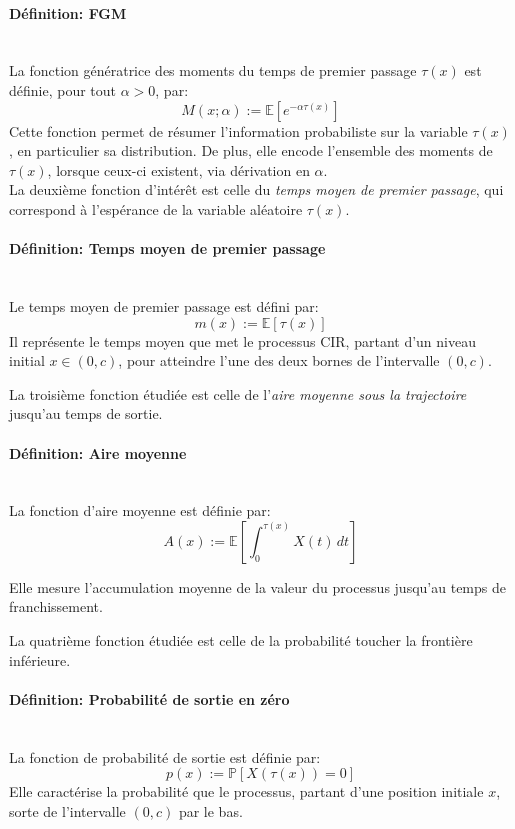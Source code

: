 \paragraph{Définition: \ac{FGM}}\mbox{}\\
La fonction génératrice des moments du temps de premier passage $\tau(x)$ est définie, pour tout $\alpha > 0$, par:
\begin{equation}\label{fgm}
    M(x;\alpha):= \mathds{E} \left[ e^{-\alpha \tau(x)} \right]
\end{equation}
Cette fonction permet de résumer l'information probabiliste sur la variable $\tau(x)$, en particulier sa distribution. De plus, elle encode l'ensemble des moments de $\tau(x)$, lorsque ceux-ci existent, via dérivation en $\alpha$. \\

La deuxième fonction d'intérêt est celle du \textit{temps moyen de premier passage}, qui correspond à l'espérance de la variable aléatoire $\tau(x)$.
\paragraph{Définition: Temps moyen de premier passage}\mbox{}\\
Le temps moyen de premier passage est défini par:
\begin{equation}\label{mean}
    m(x):= \mathds{E}[\tau(x)]
\end{equation}
Il représente le temps moyen que met le processus \acs{CIR}, partant d'un niveau initial $x \in (0,c)$, pour atteindre l'une des deux bornes de l'intervalle $(0,c)$.

La troisième fonction étudiée est celle de l'\textit{aire moyenne sous la trajectoire} jusqu'au temps de sortie.
\paragraph{Définition: Aire moyenne}\mbox{}\\
La fonction d'aire moyenne est définie par:
\begin{equation}\label{area}
    A(x):= \mathds{E} \left[ \int_0^{\tau(x)} X(t)\,dt \right]
\end{equation}

Elle mesure l'accumulation moyenne de la valeur du processus jusqu'au temps de franchissement.

La quatrième fonction étudiée est celle de la probabilité toucher la frontière inférieure.
\paragraph{Définition: Probabilité de sortie en zéro}\mbox{}\\
La fonction de probabilité de sortie est définie par:
\begin{equation}\label{zero_exit_probability}
    p(x):=\mathds{P}[X(\tau(x))=0]
\end{equation}
Elle caractérise la probabilité que le processus, partant d'une position initiale $x$, sorte de l'intervalle $(0,c)$ par le bas.

